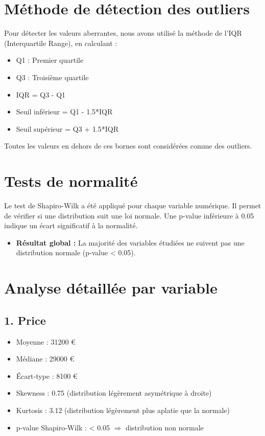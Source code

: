 \documentclass[12pt]{report}
\begin{document}
\section{Méthode de détection des outliers}
Pour détecter les valeurs aberrantes, nous avons utilisé la méthode de l’IQR (Interquartile Range), en calculant :

\begin{itemize}
    \item Q1 : Premier quartile
    \item Q3 : Troisième quartile
    \item IQR = Q3 - Q1
    \item Seuil inférieur = Q1 - 1.5*IQR
    \item Seuil supérieur = Q3 + 1.5*IQR
\end{itemize}

Toutes les valeurs en dehors de ces bornes sont considérées comme des outliers.

\section{Tests de normalité}
Le test de Shapiro-Wilk a été appliqué pour chaque variable numérique. Il permet de vérifier si une distribution suit une loi normale. Une p-value inférieure à 0.05 indique un écart significatif à la normalité.

\begin{itemize}
    \item \textbf{Résultat global :} La majorité des variables étudiées ne suivent pas une distribution normale (p-value < 0.05).
\end{itemize}

\section{Analyse détaillée par variable}

\subsection*{\textbf{1. Price}}
\begin{itemize}
    \item Moyenne : 31200 €
    \item Médiane : 29000 €
    \item Écart-type : 8100 €
    \item Skewness : 0.75 (distribution légèrement asymétrique à droite)
    \item Kurtosis : 3.12 (distribution légèrement plus aplatie que la normale)
    \item p-value Shapiro-Wilk : < 0.05 $\Rightarrow$ distribution non normale
\end{itemize}
\end{document}
